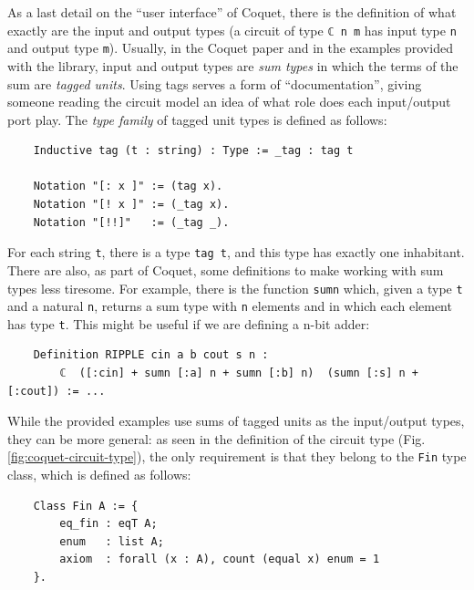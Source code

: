 \documentclass[a4paper]{article}
\begin{document}
                As a last detail on the ``user interface'' of Coquet, there is the definition of
                what exactly are the input and output types (a circuit of type \texttt{ℂ n m} has
                input type \texttt{n} and output type \texttt{m}). Usually, in the Coquet
                paper\cite{coquet2011} and in the examples provided with the library, input and
                output types are \emph{sum types} in which the terms of the sum are \emph{tagged
                    units}. Using tags serves a form of ``documentation'', giving someone reading
                the circuit model an idea of what role does each input/output port play. The
                \emph{type family} of tagged unit types is defined as follows:
                \begin{verbatim}
    Inductive tag (t : string) : Type := _tag : tag t

    Notation "[: x ]" := (tag x).
    Notation "[! x ]" := (_tag x).
    Notation "[!!]"   := (_tag _).
                \end{verbatim}

                For each string \texttt{t}, there is a type \texttt{tag t}, and this type has
                exactly one inhabitant. There are also, as part of Coquet, some definitions to make
                working with sum types less tiresome. For example, there is the function
                \texttt{sumn} which, given a type \texttt{t} and a natural \texttt{n}, returns a
                sum type with \texttt{n} elements and in which each element has type \texttt{t}.
                This might be useful if we are defining a n-bit adder:
                \begin{verbatim}
    Definition RIPPLE cin a b cout s n :
        ℂ  ([:cin] + sumn [:a] n + sumn [:b] n)  (sumn [:s] n + [:cout]) := ...
                \end{verbatim}

                While the provided examples use sums of tagged units as the input/output types, they
                can be more general: as seen in the definition of the circuit type (Fig.
                \ref{fig:coquet-circuit-type}), the only requirement is that they belong to the
                \texttt{Fin} type class, which is defined as follows:

                \begin{verbatim}
    Class Fin A := {
        eq_fin : eqT A;
        enum   : list A;
        axiom  : forall (x : A), count (equal x) enum = 1
    }.
                \end{verbatim}
\end{document}
